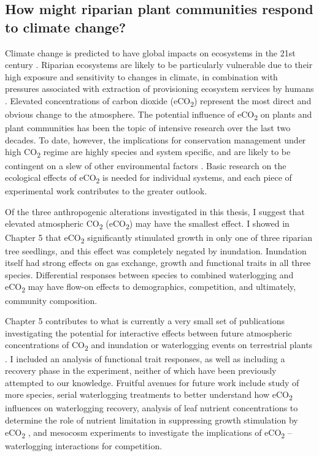 \documentclass[openright,12pt,a4paper]{memoir}
\begin{document}
{{\subsection{How might riparian plant communities respond to climate change?}
Climate change is predicted to have global impacts on ecosystems in the 21st century \citep{IPCC2014}. Riparian ecosystems are likely to be particularly vulnerable due to their high exposure and sensitivity to changes in climate, in combination with pressures associated with extraction of provisioning ecosystem services by humans \citep{Capon2013}. Elevated concentrations of carbon dioxide (eCO\textsubscript{2}) represent the most direct and obvious change to the atmosphere. The potential influence of eCO\textsubscript{2} on plants and plant communities has been the topic of intensive research over the last two decades. To date, however, the implications for conservation management under high CO\textsubscript{2} regime are highly species and system specific, and are likely to be contingent on a slew of other environmental factors \citep{Poorter2003a, Norby2011, Poorter2011, Reich2014}. Basic research on the ecological effects of eCO\textsubscript{2} is needed for individual systems, and each piece of experimental work contributes to the greater outlook.

Of the three anthropogenic alterations investigated in this thesis, I suggest that elevated atmospheric CO\textsubscript{2} (eCO\textsubscript{2}) may have the smallest effect. I showed in Chapter 5 that eCO\textsubscript{2} significantly stimulated growth in only one of three riparian tree seedlings, and this effect was completely negated by inundation. Inundation itself had strong effects on gas exchange, growth and functional traits in all three species. Differential responses between species to combined waterlogging and eCO\textsubscript{2} may have flow-on effects to demographics, competition, and ultimately, community composition.
 
Chapter 5 contributes to what is currently a very small set of publications investigating the potential for interactive effects between future atmospheric concentrations of CO\textsubscript{2} and inundation or waterlogging events on terrestrial plants \citep{Megonigal2005, Shimono2012, Arenque2014}. I included an analysis of functional trait responses, as well as including a recovery phase in the experiment, neither of which have been previously attempted to our knowledge. Fruitful avenues for future work include study of more species, serial waterlogging treatments to better understand how eCO\textsubscript{2} influences on waterlogging recovery, analysis of leaf nutrient concentrations to determine the role of nutrient limitation in suppressing growth stimulation by eCO\textsubscript{2} \citep{Reich2014}, and mesocosm experiments to investigate the implications of eCO\textsubscript{2} – waterlogging interactions for competition.

}}
\end{document}
